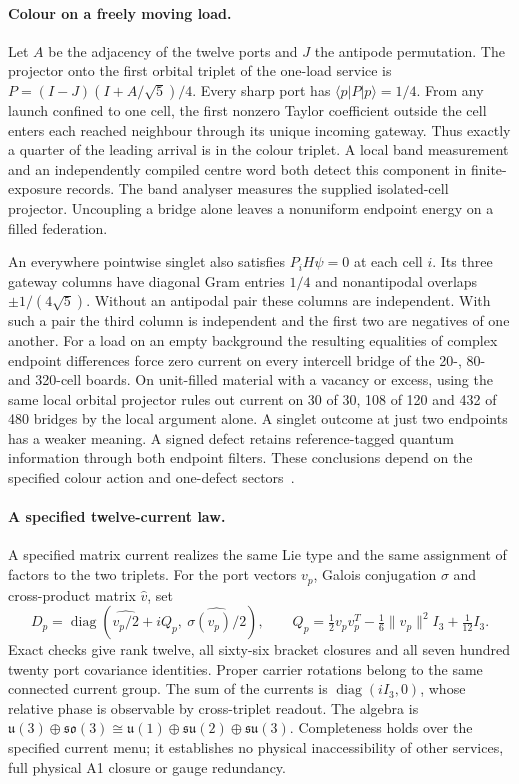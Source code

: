 \documentclass[11pt]{article}
\begin{document}
\paragraph{Colour on a freely moving load.}
Let $A$ be the adjacency of the twelve ports and $J$ the antipode
permutation. The projector onto the first orbital triplet of the
one-load service is $P=(I-J)(I+A/\sqrt5)/4$. Every sharp port has
$\langle p|P|p\rangle=1/4$. From any launch confined to one cell,
the first nonzero Taylor coefficient outside the cell enters each
reached neighbour through its unique incoming gateway. Thus exactly a quarter
of the leading arrival is in the colour triplet. A local band
measurement and an independently compiled centre word both detect
this component in finite-exposure records. The band analyser measures
the supplied isolated-cell projector. Uncoupling a bridge alone leaves
a nonuniform endpoint energy on a filled federation.

An everywhere pointwise singlet also satisfies $P_iH\psi=0$ at each
cell $i$. Its three gateway columns have diagonal Gram entries $1/4$
and nonantipodal overlaps $\pm1/(4\sqrt5)$. Without an antipodal
pair these columns are independent. With such a pair the third column
is independent and the first two are negatives of one another.
For a load on an empty background the resulting equalities of complex
endpoint differences force zero current on every intercell bridge
of the 20-, 80- and 320-cell boards. On unit-filled material with a
vacancy or excess, using the same local orbital projector rules out
current on 30 of 30, 108 of 120 and 432 of 480 bridges by the local
argument alone. A singlet outcome at just two endpoints has a weaker
meaning. A signed defect retains reference-tagged quantum information
through both endpoint filters. These conclusions depend on the
specified colour action and one-defect sectors~\cite{ophmodel}.

\paragraph{A specified twelve-current law.}
A specified matrix current realizes the same Lie type and the same
assignment of factors to the two triplets. For the port vectors \(v_p\),
Galois conjugation \(\sigma\) and cross-product matrix \(\widehat v\), set
\[
 D_p=\operatorname{diag}\left(
 \widehat{v_p/2}+iQ_p,\ \widehat{\sigma(v_p)/2}\right),
 \qquad Q_p=\tfrac12v_pv_p^T-\tfrac16\lVert v_p\rVert^2I_3+
 \tfrac1{12}I_3.
\]
Exact checks give rank twelve, all sixty-six bracket closures and all seven
hundred twenty port covariance identities. Proper carrier rotations belong
to the same connected current group. The sum of the currents is
\(\operatorname{diag}(iI_3,0)\), whose relative phase is observable by
cross-triplet readout. The algebra is
\(\mathfrak u(3)\oplus\mathfrak{so}(3)\cong\mathfrak u(1)\oplus
\mathfrak{su}(2)\oplus\mathfrak{su}(3)\). Completeness holds over the
specified current menu; it establishes no physical inaccessibility of other
services, full physical A1 closure or gauge redundancy.
\end{document}
